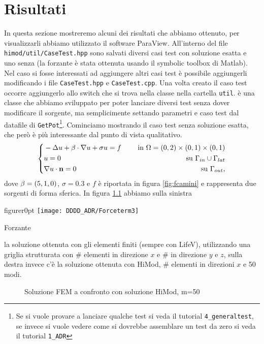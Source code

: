 \chapter{Risultati}
In questa sezione mostreremo alcuni dei risultati che abbiamo ottenuto, per visualizzarli abbiamo utilizzato
il software ParaView.
All'interno del file \texttt{himod/util/CaseTest.hpp} sono salvati diversi casi test
con soluzione esatta e uno senza (la forzante \`e stata ottenuta usando il symbolic toolbox di Matlab).
Nel caso si fosse interessati ad aggiungere altri casi test \`e possibile aggiungerli modificando i
file \texttt{CaseTest.hpp} e \texttt{CaseTest.cpp}. Una volta creato il caso test 
occorre aggiungerlo allo switch che si trova nella classe  nella
cartella \texttt{util}.  \`e una classe che abbiamo sviluppato per poter
lanciare diversi test senza dover modificare il sorgente, ma semplicimente settando 
parametri  e caso test dal datafile di \texttt{GetPot}\footnote{Se si vuole provare a lanciare qualche test si veda il tutorial
\texttt{4\_generaltest}, se invece si vuole vedere come si dovrebbe assemblare un test da zero si veda il tutorial \texttt{1\_ADR} }.
Cominciamo mostrando il caso test senza soluzione esatta, che per\`o \`e pi\`u interessante dal punto di vista qualitativo.
\begin{equation}
 \label{eq:camini}
 \left\{
\begin{aligned}
 &-\Delta u + \mathbf{\beta}\cdot\nabla u + \sigma u = f &\quad \text{ in }\Omega=(0,2)\times(0,1)\times(0,1)\\
 &u=0 &\quad \text{ su } \Gamma_{in} \cup \Gamma_{lat}\\
 &\nabla u\cdot \mathbf{n} = 0 &\quad \text{ su } \Gamma_{out},
\end{aligned}
\right.
\end{equation}
dove $\mathbf{\beta}=(5,1,0)$, $\sigma=0.3$ e $f$ \`e riportata in figura \ref{fig:fcamini} e rappresenta due sorgenti 
di forma sferica.
In figura \ref{fig:confrontocamini} abbiamo sulla sinistra\begin{wrapfloat}{figure}{r}{0pt}
\texttt{[image: DDDD\_ADR/Forceterm3]}
 \caption{Forzante}
 \label{fig:fcamini}
\end{wrapfloat} la soluzione ottenuta con
gli elementi finiti (sempre con LifeV), utilizzando una griglia strutturata con \# elementi in direzione $x$
e \# in direzione $y$ e $z$, sulla destra invece c'\`e la soluzione ottenuta con HiMod, \# elementi in direzioni $x$
e 50 modi.
\begin{figure}[!h]
\centering
{}
\hspace{20mm}
\caption{Soluzione FEM a confronto con soluzione HiMod, m=50}
\label{fig:confrontocamini}
\end{figure}
